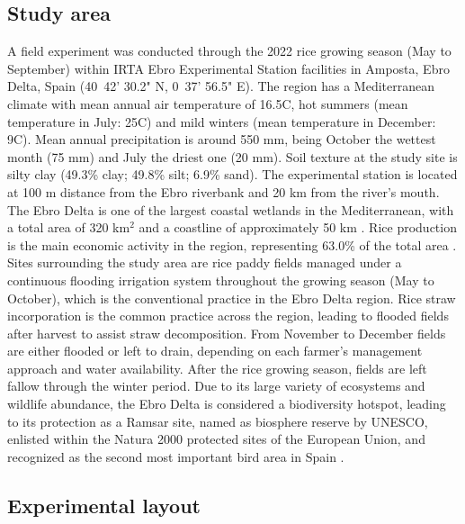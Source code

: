 \subsection{Study area}
\label{sec:meth_Site1}

A field experiment was conducted through the 2022 rice growing season (May to September) within IRTA Ebro Experimental Station facilities in Amposta, Ebro Delta, Spain (40\degree\ 42' 30.2" N, 0\degree\ 37' 56.5" E). The region has a Mediterranean climate with mean annual air temperature of 16.5\degree C, hot summers (mean temperature in July: 25\degree C) and mild winters (mean temperature in December: 9\degree C). Mean annual precipitation is around 550 mm, being October the wettest month (75 mm) and July the driest one (20 mm). Soil texture at the study site is silty clay (49.3\% clay; 49.8\% silt; 6.9\% sand). The experimental station is located at 100 m distance from the Ebro riverbank and 20 km from the river's mouth. The Ebro Delta is one of the largest coastal wetlands in the Mediterranean, with a total area of 320 km$^{2}$ and a coastline of approximately 50 km \citep{rodriguez-santalla2021}. Rice production is the main economic activity in the region, representing 63.0\% of the total area \citep{genua-olmedo2016}. Sites surrounding the study area are rice paddy fields managed under a continuous flooding irrigation system throughout the growing season (May to October), which is the conventional practice in the Ebro Delta region. Rice straw incorporation is the common practice across the region, leading to flooded fields after harvest to assist straw decomposition. From November to December fields are either flooded or left to drain, depending on each farmer's management approach and water availability. After the rice growing season, fields are left fallow through the winter period. Due to its large variety of ecosystems and wildlife abundance, the Ebro Delta is considered a biodiversity hotspot, leading to its protection as a Ramsar site, named as biosphere reserve by UNESCO, enlisted within the Natura 2000 protected sites of the European Union, and recognized as the second most important bird area in Spain \citep{day2006, romagosa2013sustainability, genua-olmedo2016}. 

\subsection{Experimental layout}
\label{sec:meth_Exp1}

